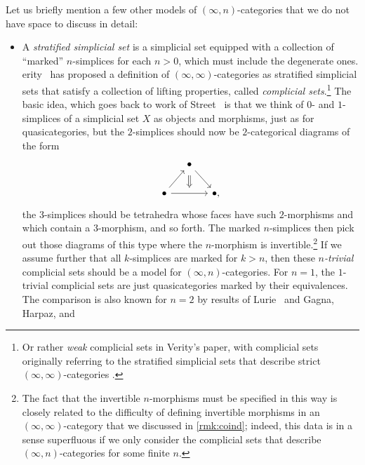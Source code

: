 \documentclass[a4paper,12pt]{article}
\begin{document}
\begin{remark}\label{rmk:otherinftyn}
  Let us briefly mention a few other models of $(\infty,n)$-categories
  that we do not have space to discuss in detail:
  \begin{itemize}
  \item A \emph{stratified simplicial set} is a simplicial set
    equipped with a collection of ``marked'' $n$-simplices for each $n >
    0$, which must include the degenerate ones.
    erity~\cite{VerityCompl} has proposed a definition
    of $(\infty,\infty)$-categories as stratified simplicial sets that
    satisfy a collection of lifting properties, called
    \emph{complicial sets}.\footnote{Or rather \emph{weak} complicial
      sets in Verity's paper, with complicial sets originally
      referring to the stratified simplicial sets that describe strict
      $(\infty,\infty)$-categories \cite{VerityStrict}.}
    The basic idea, which goes back to work of
    Street~\cite{StreetOriented} is that we think of $0$- and
    $1$-simplices of a simplicial set $X$ as objects and morphisms,
    just as for quasicategories, but the $2$-simplices should now be
    $2$-categorical diagrams of the form
    \[
      \begin{tikzcd}[column sep=small]
        {} & \bullet \ar[dr] \\
        \bullet \ar[ur] \ar[rr, ""{above,name=A}] & &
        \bullet,
        \ar[from=1-2, to=A, Rightarrow, shorten <=5pt, shorten >= 1pt]
      \end{tikzcd}
    \]
    the $3$-simplices should be tetrahedra whose faces have such
    $2$-morphisms and which contain a $3$-morphism, and so forth. The marked
    $n$-simplices then pick out those diagrams of this type where the
    $n$-morphism is invertible.\footnote{The fact that the invertible
      $n$-morphisms must be specified in this way is closely related
      to the difficulty of defining invertible morphisms in an
      $(\infty,\infty)$-category that we discussed in
      \cref{rmk:coind}; indeed, this data is in a sense superfluous if
      we only consider the complicial sets that describe
      $(\infty,n)$-categories for some finite $n$.}  If we assume
    further that all $k$-simplices are marked for $k > n$, then these
    \emph{$n$-trivial} complicial sets should be a model for
    $(\infty,n)$-categories. For $n = 1$, the $1$-trivial complicial
    sets are just quasicategories marked by their equivalences. The
    comparison is also known for $n = 2$ by results of
    Lurie~\cite{LurieGoodwillie} and Gagna, Harpaz, and

\end{itemize}
\end{remark}
\end{document}
